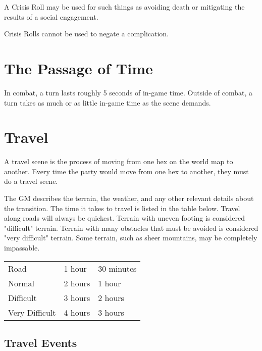 \begin{multicols}{2}
A Crisis Roll may be used for such things as avoiding death or
mitigating the results of a social engagement.

Crisis Rolls cannot be used to negate a complication.

\section{The Passage of Time}

In combat, a turn lasts roughly 5 seconds of in-game time. Outside
of combat, a turn takes as much or as little in-game time as the
scene demands.

\section{Travel} 

A travel scene is the process of moving from one hex on the world map
to another. Every time the party would move from one hex to another,
they must do a travel scene.

The GM describes the terrain, the weather, and any other relevant
details about the transition. The time it takes to travel is listed
in the table below. Travel along roads will always be quickest. Terrain
with uneven footing is considered "difficult" terrain. Terrain with many
obstacles that must be avoided is considered "very difficult" terrain.
Some terrain, such as sheer mountains, may be completely impassable.

\begin{center}
{
\begin{xtabular}{|l|l|l|}
Road & 1 hour & 30 minutes \\
Normal & 2 hours & 1 hour \\
Difficult & 3 hours & 2 hours \\
Very Difficult & 4 hours & 3 hours \\
\hline
\end{xtabular}
}
\end{center}

\subsection{Travel Events}


\end{multicols}
